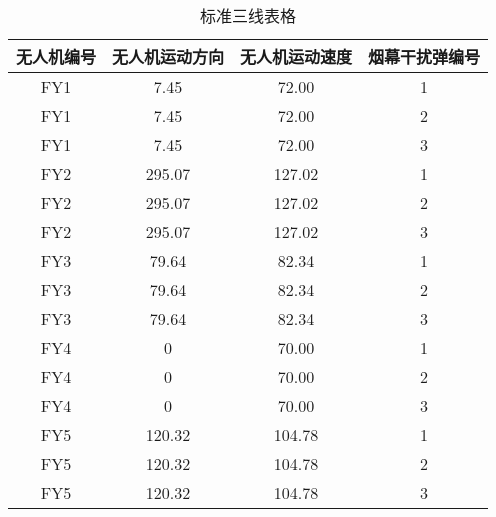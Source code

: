 \documentclass[../main.tex]{subfiles}
\begin{document}
\begin{table}[H]
\caption{标准三线表格}
\label{tab:001} 
\centering
\begin{small}
\begin{tabular}{cccc}
\toprule[1.5pt]
无人机编号 &无人机运动方向 & 无人机运动速度  &烟幕干扰弹编号     \\  
\midrule[1pt]
  FY1           &7.45                   & 72.00     & 1     \\               
   FY1          &7.45                  & 72.00     & 2      \\               
   FY1          &7.45                   & 72.00     & 3    \\                
  FY2           &295.07                   & 127.02     & 1      \\                
  FY2           &295.07                   & 127.02     & 2       \\               
  FY2           &295.07                   & 127.02    & 3     \\               
  FY3           & 79.64                  & 82.34     & 1       \\               
FY3             & 79.64                  & 82.34     & 2    \\                
FY3             & 79.64                  & 82.34    & 3      \\                
  FY4           &0                   & 70.00     & 1      \\                
  FY4           &0                   & 70.00     & 2       \\               
  FY4           &0                   & 70.00    & 3     \\               
  FY5          & 120.32                 & 104.78     & 1       \\               
FY5         & 120.32                 & 104.78    & 2    \\                
FY5          &120.32                  & 104.78     & 3      \\               
\bottomrule[1.5pt]
\end{tabular}
\end{small}
\end{table}
\end{document}
